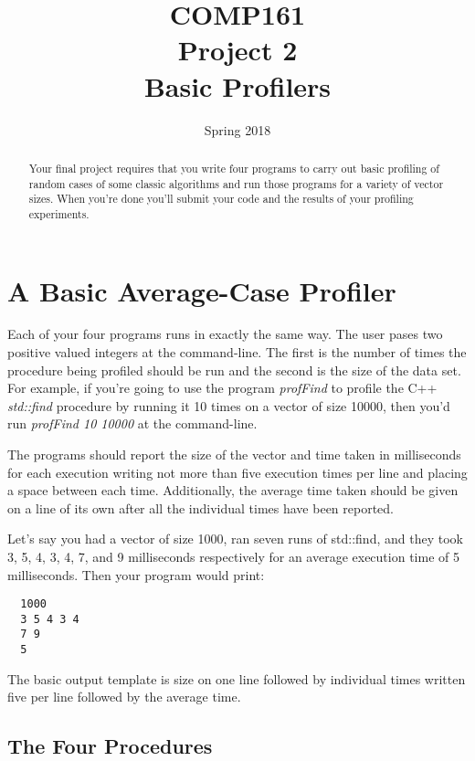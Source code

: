 \documentclass[]{tufte-handout}
\title{COMP161 \\ Project 2 \\ Basic Profilers}
\author{}
\date{Spring 2018}
\begin{document}
\maketitle

\begin{abstract}
Your final project requires that you write four programs to carry out basic profiling of random cases of some classic algorithms and run those programs for a variety of vector sizes. When you're done you'll submit your code and the results of your profiling experiments.
\end{abstract}

\section{A Basic Average-Case Profiler}

Each of your four programs runs in exactly the same way.  The user pases two positive valued integers at the command-line. The first is the number of times the procedure being profiled should be run and the second is the size of the data set.  For example, if you're going to use the program \textit{profFind} to profile the C++ \textit{std::find} procedure by running it 10 times on a vector of size 10000, then you'd run \textit{profFind 10 10000} at the command-line.

The programs should report the size of the vector and time taken in milliseconds for each execution writing not more than five execution times per line and placing a space between each time. Additionally, the average time taken should be given on a line of its own after all the individual times have been reported.

Let's say you had a vector of size 1000, ran seven runs of std::find, and they took 3, 5, 4, 3, 4, 7, and 9 milliseconds respectively for an average execution time of 5 milliseconds. Then your program would print:

\begin{verbatim}
  1000
  3 5 4 3 4
  7 9
  5
\end{verbatim}

The basic output template is size on one line followed by individual times written five per line followed by the average time.

\subsection{ The Four Procedures }
\end{document}

